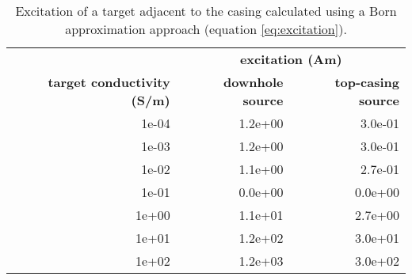 \begin{table}
\centering
    \begin{tabular}[H]{| r | r | r |}
        \hline
                                           & \multicolumn{2}{|c|}{\textbf{excitation (Am)}} \\
        \textbf{target conductivity (S/m)} & \textbf{downhole source} & \textbf{top-casing source} \\
        \hline
        1e-04 & 1.2e+00 & 3.0e-01 \\
        1e-03 & 1.2e+00 & 3.0e-01 \\
        1e-02 & 1.1e+00 & 2.7e-01 \\
        1e-01 & 0.0e+00 & 0.0e+00 \\
        1e+00 & 1.1e+01 & 2.7e+00 \\
        1e+01 & 1.2e+02 & 3.0e+01 \\
        1e+02 & 1.2e+03 & 3.0e+02 \\
        \hline
    \end{tabular}
    \caption{Excitation of a target adjacent to the casing calculated using a Born approximation approach (equation \ref{eq:excitation}).}
    \label{tab:adjacent_target_excitation}
 \end{table}
